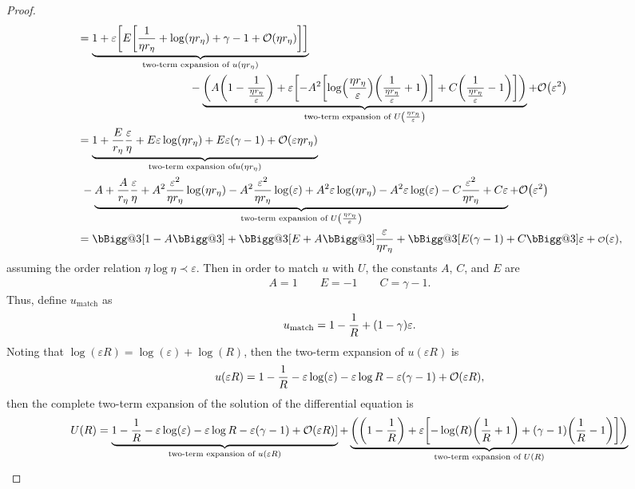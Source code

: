 \documentclass{article} %
\makeatletter
\theoremstyle{plain}
\newcommand{\BIGG}{\bBigg@{3}}
\newcommand{\E}{\varepsilon}
\newcommand{\littleo}[1]{\text{\scriptsize$\mathcal{O}$}\qty(#1)}
\numberwithin{equation}{section} %
\numberwithin{figure}{section} %
\numberwithin{table}{section} %
\makeatother
\begin{document}
\begin{proof}
\begin{align*}
        &= \underbrace{1 + \E\qty[E\qty[\frac{1}{\eta r_\eta} + \log(\eta r_\eta) + \gamma - 1 + \order{\eta r_\eta}]]}_{\text{two-term expansion of } u(\eta r_\eta)} \\
        &\qquad\qquad\qquad\qquad\qquad - \underbrace{\qty(A\qty(1 - \frac{1}{\frac{\eta r_\eta}{\E}}) + \E\qty[-A^2\qty[\log(\frac{\eta r_\eta}{\E})\qty(\dfrac{1}{\frac{\eta r_\eta}{\E}} + 1)] + C\qty(\dfrac{1}{\frac{\eta r_\eta}{\E}} - 1)])}_{\text{two-term expansion of } U\qty(\frac{\eta r_\eta}{\E})} + \order{\E^2} \\
        &= \underbrace{1 + \frac{E}{r_\eta}\frac{\E}{\eta} + E\E\log(\eta r_\eta) + E\E\qty(\gamma - 1) + \order{\E\eta r_\eta}}_{\text{two-term expansion of} u(\eta r_\eta)} \\
        &\ - \underbrace{A + \frac{A}{r_\eta}\frac{\E}{\eta} + A^2\frac{\E^2}{\eta r_\eta}\log(\eta r_\eta) - A^2\frac{\E^2}{\eta r_\eta}\log(\E) + A^2\E\log(\eta r_\eta) - A^2\E\log(\E) - C \frac{\E^2}{\eta r_\eta} + C\E}_{\text{two-term expansion of } U\qty(\frac{\eta r_\eta}{\E})} + \order{\E^2} \\
        &= \BIGG[1 - A\BIGG] + \BIGG[E + A\BIGG]\frac{\E}{\eta r_\eta} + \BIGG[E\qty(\gamma - 1) + C\BIGG]\E + \littleo{\E},
    \end{align*}
    assuming the order relation $\eta \log\eta \prec \E$.  Then in order to match $u$ with $U$, the constants $A$, $C$, and $E$ are
    \begin{align*}
        A = 1 \qquad E = -1 \qquad C = \gamma - 1.
    \end{align*}
    Thus, define $u_\text{match}$ as
    \begin{align*}
        u_\text{match} = 1 - \frac{1}{R} + \qty(1 - \gamma)\E.
    \end{align*}
    Noting that $\log(\E R) = \log(\E) + \log(R)$, then the two-term expansion of $u(\E R)$ is
    \begin{align*}
        u(\E R) = 1 - \frac{1}{R} - \E \log(\E) - \E\log R - \E\qty(\gamma - 1) + \order{\E R},
    \end{align*}
    then the complete two-term expansion of the solution of the differential equation is
    \begin{align*}
        U(R) &= \underbrace{1 - \frac{1}{R} - \E \log(\E) - \E\log R - \E\qty(\gamma - 1) + \order{\E R}]}_{\text{two-term expansion of } u(\E R)} + \underbrace{\qty(\qty(1 - \frac{1}{R}) + \E\qty[-\log(R)\qty(\dfrac{1}{R} + 1) + \qty(\gamma - 1)\qty(\dfrac{1}{R} - 1)])}_{\text{two-term expansion of } U(R)} \\

\end{align*}
\end{proof}
\end{document}
